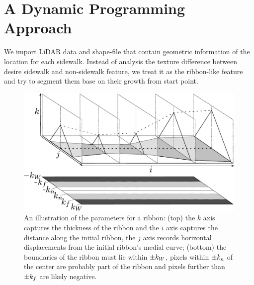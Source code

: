 \chapter{A Dynamic Programming Approach}

We import LiDAR data and shape-file that contain geometric information of the location for each sidewalk. 
Instead of analysis the texture difference between desire sidewalk and non-sidewalk feature, we treat it as the ribbon-like feature and try to segment them base on their growth from start point. 


\begin{figure}[htb]
    \centering
    \includegraphics[width=\textwidth]{Figures/ribbon-3d-combined.pdf}
    \caption[3D Ribbon Image]{An illustration of the parameters for a ribbon: (top) the $k$ axis captures the thickness of the ribbon and the $i$ axis captures the distance along the initial ribbon, the $j$ axis records horizontal displacements from the initial ribbon's medial curve; (bottom) the boundaries of the ribbon must lie within $\pm k_W{}$, pixels within $\pm k_n{}$ of the center are probably part of the ribbon and pixels further than $\pm k_f{}$ are likely negative. }
    \label{fig:ribbon_3d}
\end{figure}

